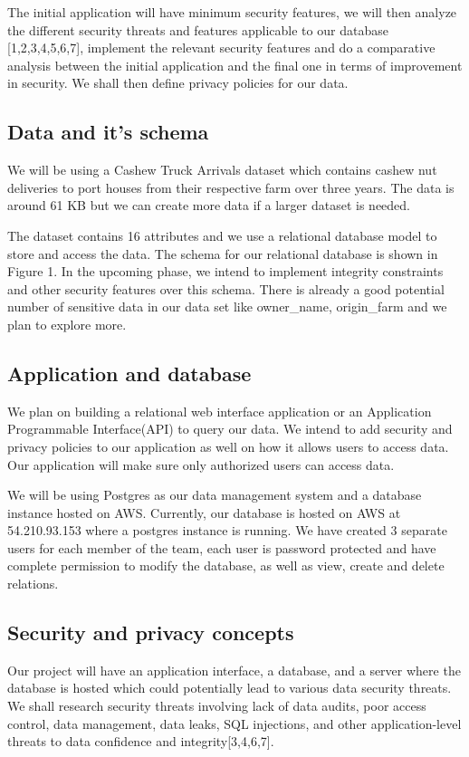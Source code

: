 \documentclass[sigconf]{acmart}
\begin{document}
The initial application will have minimum security features, we will then analyze the different security threats and features applicable to our database [1,2,3,4,5,6,7], implement the relevant security features and do a comparative analysis between the initial application and the final one in terms of improvement in security. We shall then define privacy policies for our data.


\subsection{Data and it's schema}

We will be using a Cashew Truck Arrivals dataset which contains cashew nut deliveries to port houses from their respective farm over three years. The data is around 61 KB but we can create more data if a larger dataset is needed. 

The dataset contains 16 attributes and we use a relational database model to store and access the data. The schema for our relational database is shown in Figure 1. In the upcoming phase, we intend to implement integrity constraints and other security features over this schema. There is already a good potential number of sensitive data in our data set like owner\_name, origin\_farm and we plan to explore more. 

\subsection{Application and database}
We plan on building a relational web interface application or an Application Programmable Interface(API) to query our data. We intend to add security and privacy policies to our application as well on how it allows users to access data. Our application will make sure only authorized users can access data. 

We will be using Postgres as our data management system and a database instance hosted on AWS. Currently, our database is hosted on AWS at 54.210.93.153 where a postgres instance is running. We have created 3 separate users for each member of the team, each user is password protected and have complete permission to modify the database, as well as view, create and delete relations. 

\subsection{Security and privacy concepts}
Our project will have an application interface, a database, and a server where the database is hosted which could potentially lead to various data security threats. We shall research security threats involving lack of data audits, poor access control, data management, data leaks, SQL injections, and other application-level threats to data confidence and integrity[3,4,6,7]. 
\end{document}
